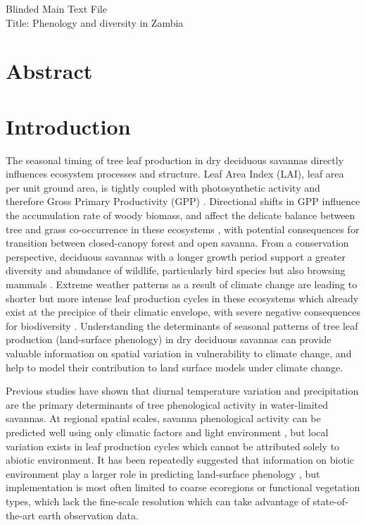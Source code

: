 \documentclass[11pt,a4paper]{article}
\newcommand{\titletext}{Phenology and diversity in Zambia}
\begin{document}
{\Large{Blinded Main Text File}}\\
{\Large{Title: \titletext{}}}

\section*{Abstract}

\section{Introduction}

The seasonal timing of tree leaf production in dry deciduous savannas directly influences ecosystem processes and structure. Leaf Area Index (LAI), leaf area per unit ground area, is tightly coupled with photosynthetic activity and therefore Gross Primary Productivity (GPP) \citep{Gu2003, Penuelas2009}. Directional shifts in GPP influence the accumulation rate of woody biomass, and affect the delicate balance between tree and grass co-occurrence in these ecosystems \citep{Stevens2016}, with potential consequences for transition between closed-canopy forest and open savanna. From a conservation perspective, deciduous savannas with a longer growth period support a greater diversity and abundance of wildlife, particularly bird species but also browsing mammals \citep{Cole2015, Araujo2017, Morellato2016, Ogutu2013}. Extreme weather patterns as a result of climate change are leading to shorter but more intense leaf production cycles in these ecosystems which already exist at the precipice of their climatic envelope, with severe negative consequences for biodiversity \citep{Bale2002}. Understanding the determinants of seasonal patterns of tree leaf production (land-surface phenology) in dry deciduous savannas can provide valuable information on spatial variation in vulnerability to climate change, and help to model their contribution to land surface models under climate change.

Previous studies have shown that diurnal temperature variation and precipitation are the primary determinants of tree phenological activity in water-limited savannas. At regional spatial scales, savanna phenological activity can be predicted well using only climatic factors and light environment \citep{Adole2018a}, but local variation exists in leaf production cycles which cannot be attributed solely to abiotic environment. It has been repeatedly suggested that information on biotic environment play a larger role in predicting land-surface phenology \citep{Adole2018b, Jeganathan2014, Fuller1999}, but implementation is most often limited to coarse ecoregions or functional vegetation types, which lack the fine-scale resolution which can take advantage of state-of-the-art earth observation data. 
\end{document}
